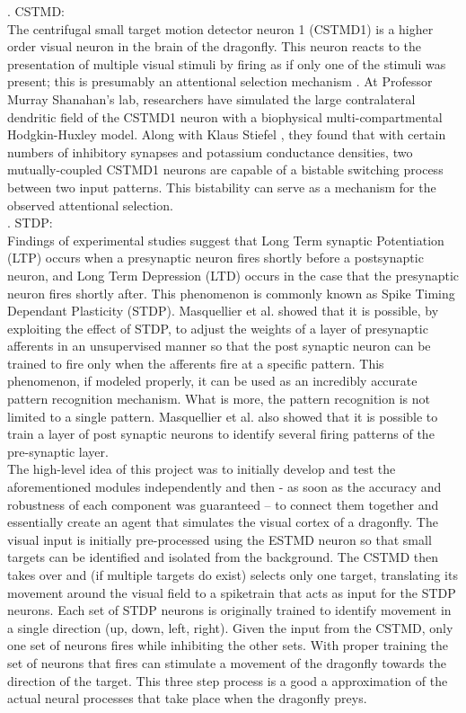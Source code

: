 \documentclass[a4paper,11pt]{article}
\begin{document}
. CSTMD:\\
The centrifugal small target motion detector neuron 1 (CSTMD1) is a higher order visual neuron in the brain of the dragonfly. This neuron reacts to the presentation of multiple visual stimuli by firing as if only one of the stimuli was present; this is presumably an attentional selection mechanism \cite{w13}. At Professor Murray Shanahan's lab, researchers have simulated the large contralateral dendritic field of the CSTMD1 neuron with a biophysical multi-compartmental Hodgkin-Huxley model. Along with Klaus Stiefel \cite{ne13}, they found that with certain numbers of inhibitory synapses and potassium conductance densities, two mutually-coupled CSTMD1 neurons are capable of a bistable switching process between two input patterns. This bistability can serve as a mechanism for the observed attentional selection.\\

. STDP:\\
Findings of experimental studies suggest that Long Term synaptic Potentiation (LTP) occurs when a presynaptic neuron fires shortly before a postsynaptic neuron, and Long Term Depression (LTD) occurs in the case that the presynaptic neuron fires shortly after. This phenomenon is commonly known as Spike Timing Dependant Plasticity (STDP)\cite{stdp1}. Masquellier et al. showed that it is possible, by exploiting the effect of STDP, to adjust the weights of a layer of presynaptic afferents in an unsupervised manner so that the post synaptic neuron can be trained to fire only when the afferents fire at a specific pattern. This phenomenon, if modeled properly, it can be used as an incredibly accurate pattern recognition mechanism. What is more, the pattern recognition is not limited to a single pattern. Masquellier et al. also showed that it is possible to train a layer of post synaptic neurons to identify several firing patterns of the pre-synaptic layer\cite{stdp2}.\\ 



The high-level idea of this project was to initially develop and test the aforementioned modules independently and then - as soon as the accuracy and robustness of each component was guaranteed – to connect them together and essentially create an agent that simulates the visual cortex of a dragonfly. The visual input is initially pre-processed using the ESTMD neuron so that small targets can be identified and isolated from the background. The CSTMD then takes over and (if multiple targets do exist) selects only one target, translating its movement around the visual field to a spiketrain that acts as input for the STDP neurons. Each set of STDP neurons is originally trained to identify movement in a single direction (up, down, left, right). Given the input from the CSTMD, only one set of neurons fires while inhibiting the other sets. With proper training the set of neurons that fires can stimulate a movement of the dragonfly towards the direction of the target. This three step process is a good a approximation of the actual neural processes that take place when the dragonfly preys.
\end{document}
